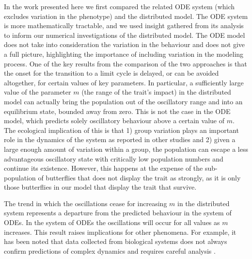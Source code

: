 \documentclass[review,authoryear]{elsarticle}
\newcommand{\origM}{m}
\begin{document}
 
  In the work presented here we first compared the related ODE system (which excludes variation in the phenotype) and the distributed model. The ODE system is more mathematically tractable, and we used insight gathered from its analysis to inform our numerical investigations of the distributed model. The ODE model does not take into consideration the variation in the behaviour and does not give a full picture, highlighting the importance of including variation in the modeling process. One of the key results from the comparison of the two approaches is that the onset for the transition to a limit cycle is delayed, or can be avoided altogether, for certain values of key parameters. In particular, a sufficiently large value of the parameter $\origM$ (the range of the trait’s impact) in the distributed model can actually bring the population out of the oscillatory range and into an equilibrium state, bounded away from zero. This is not the case in the ODE model, which predicts solely oscillatory behaviour above a certain value of $\origM$. The ecological implication of this is that 1) group variation plays an important role in the dynamics of the system as reported in other studies \citep{doi:10.1111/j.1461-0248.2010.01536.x} and 2) given a large enough amount of variation within a group, the population can escape a less advantageous oscillatory state with critically low population numbers and continue its existence. However, this happens at the expense of the sub-population of butterflies that does not display the trait as strongly, as it is only those butterflies in our model that display the trait that survive.
  
  The trend in which the oscillations cease for increasing $\origM$ in the distributed system represents a departure from the predicted behaviour in the system of ODEs. In the system of ODEs the oscillations will occur for all values as $\origM$ increases. This result raises implications for other phenomena. For example, it has been noted that data collected from biological systems does not always confirm predictions of complex dynamics and requires careful analysis \citep{Skinner1994}.  
 
\end{document}
